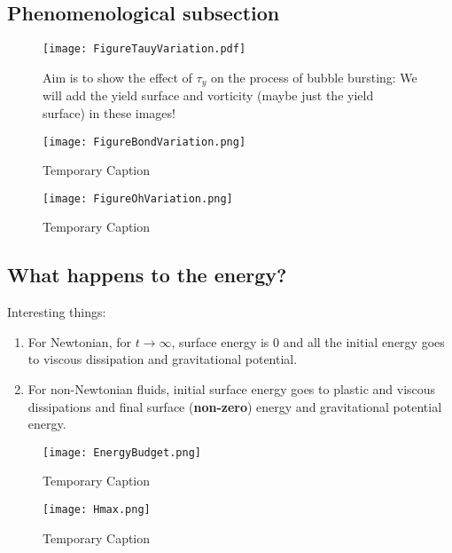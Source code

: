 \documentclass{jfm}
\begin{document}
\subsection{Phenomenological subsection}
\begin{figure}
  \centerline{\texttt{[image: FigureTauyVariation.pdf]}}%
  \caption{Aim is to show the effect of $\tau_y$ on the process of bubble bursting: We will add the yield surface and vorticity (maybe just the yield surface) in these images!}
\label{fig:TauyVariation}
\end{figure}
\begin{figure}
	\centerline{\texttt{[image: FigureBondVariation.png]}}%
	\caption{Temporary Caption}
	\label{fig:BoVariation}
\end{figure}
\begin{figure}
	\centerline{\texttt{[image: FigureOhVariation.png]}}%
	\caption{Temporary Caption}
	\label{fig:OhVariation}
\end{figure}
\lipsum[1]
\subsection{What happens to the energy?}
Interesting things:
\begin{enumerate}
	\item For Newtonian, for $t \to \infty$, surface energy is 0 and all the initial energy goes to viscous dissipation and gravitational potential. 
	\item For non-Newtonian fluids, initial surface energy goes to plastic and viscous dissipations and final surface (\textbf{non-zero}) energy and gravitational potential energy.
\end{enumerate}
\begin{figure}
\centerline{\texttt{[image: EnergyBudget.png]}}%
\caption{Temporary Caption}
\label{fig:EnergyBudget}
\end{figure}
\begin{figure}
	\centerline{\texttt{[image: Hmax.png]}}%
	\caption{Temporary Caption}
	\label{fig:Hmax}
\end{figure}
\end{document}
